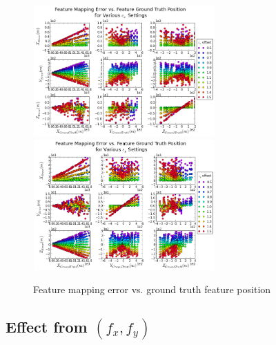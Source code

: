 \begin{figure}[h]
  \centering
  \includegraphics[width=7cm, height=5cm]{./Figures/SimulationFigures/Figure32.png}
  \includegraphics[width=7cm, height=5cm]{./Figures/SimulationFigures/Figure33.png}
  \caption{Feature mapping error vs. ground truth feature position}
  \label{fig:simfig32-33}
\end{figure}

\FloatBarrier
\subsection{Effect from $(f_x, f_y)$}


